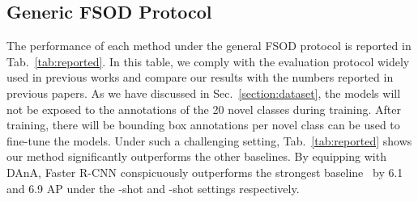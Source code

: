 \documentclass[journal]{IEEEtran}
\begin{document}
\subsection{Generic FSOD Protocol}
The performance of each method under the general FSOD protocol is reported in Tab.~\ref{tab:reported}.
In this table, we comply with the evaluation protocol widely used in previous works and compare our results with the numbers reported in previous papers.  
As we have discussed in Sec.~\ref{section:dataset}, the models will not be exposed to the annotations of the 20 novel classes during training.
After training, there will be  bounding box annotations per novel class can be used to fine-tune the models.
Under such a challenging setting, Tab.~\ref{tab:reported} shows our method significantly outperforms the other baselines.
By equipping with DAnA, Faster R-CNN conspicuously outperforms the strongest baseline~\cite{xiao2020few} by 6.1 and 6.9 AP under the -shot and -shot settings respectively.


\begin{table}[t!]
    \centering
    \caption{
    The results of PASCAL2COCO evaluation. All the models are trained on PASCAL VOC 2007 and tested on COCO 2014. In this setting, the base domain denotes the 20 classes shared between PASCAL VOC and COCO, while the novel domain denotes the other 60 classes in the COCO dataset.
    }
    \label{tab:pascal2coco}
\end{table}
\end{document}
